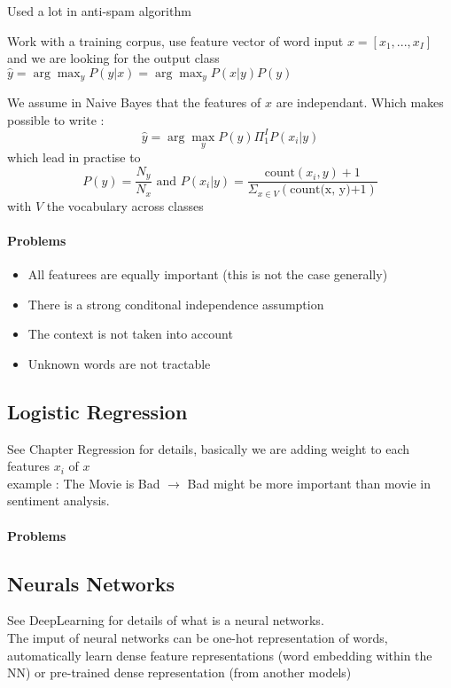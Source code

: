 			Used a lot in anti-spam algorithm

			Work with a training corpus, use feature vector of word input $x = [x_1, ..., x_I]$
			and we are looking for the output class $\hat y = \arg \max_y P(y|x) = \arg \max_y P(x | y)P(y)$

			We assume in Naive Bayes that the features of $x$ are independant. Which makes possible to write : 
			\[
				\hat y = \arg \max_y P(y) \Pi_1^I P(x_i | y)
			\]
			which lead in practise to
			\[
				P(y) = \frac{N_y}{N_x} \text{ and } P(x_i | y) = \frac{\text{count}(x_i, y)+1}{\Sigma_{x\in V}(\text{count(x, y)+1})}
			\] with $V$ the vocabulary across classes

			\paragraph*{Problems}

				\begin{itemize}
					\item All featurees are equally important (this is not the case generally)
					\item There is a strong conditonal independence assumption
					\item The context is not taken into account
					\item Unknown words are not tractable
				\end{itemize}

		\subsection{Logistic Regression}
			See Chapter Regression for details, basically we are adding weight to each features $x_i$ of $x$ \\
			example : The Movie is Bad $\rightarrow$ Bad might be more important than movie in sentiment analysis.

			\paragraph*{Problems}
				
		\subsection{Neurals Networks}
			See DeepLearning for details of what is a neural networks. \\

			The imput of neural networks can be one-hot representation of words, automatically learn dense feature representations (word embedding within the NN) or pre-trained dense representation (from another models)

